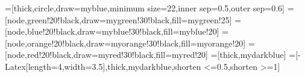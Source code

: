 \tikzset{>=latex} %
\usepackage{xcolor}
=[thick,circle,draw=myblue,minimum size=22,inner sep=0.5,outer sep=0.6]
=[node,green!20!black,draw=mygreen!30!black,fill=mygreen!25]
=[node,blue!20!black,draw=myblue!30!black,fill=myblue!20]
=[node,orange!20!black,draw=myorange!30!black,fill=myorange!20]
=[node,red!20!black,draw=myred!30!black,fill=myred!20]
=[thick,mydarkblue] %
=[-{Latex[length=4,width=3.5]},thick,mydarkblue,shorten <=0.5,shorten >=1]
\def\nstyle{int(\lay<\Nnodlen?min(2,\lay):3)} %
